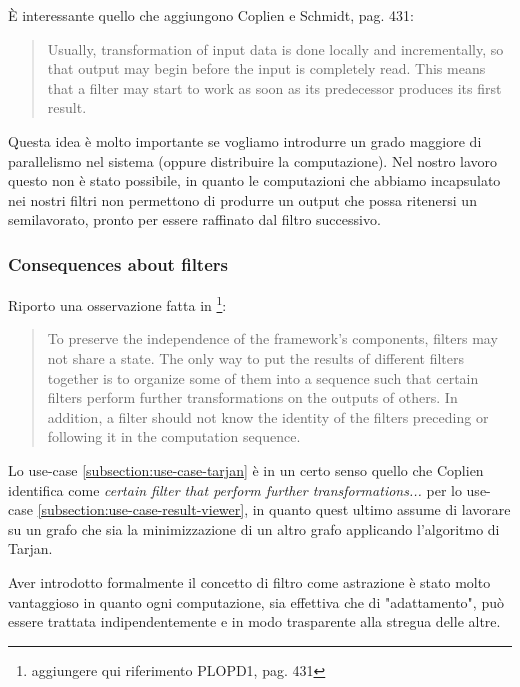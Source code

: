 \`E interessante quello che aggiungono Coplien e Schmidt, pag. 431:
\begin{quotation}
  Usually, transformation of input data is done locally and
  incrementally, so that output may begin before the input is
  completely read. This means that a filter may start to work as soon
  as its predecessor produces its first result.
\end{quotation}
Questa idea \`e molto importante se vogliamo introdurre un grado
maggiore di parallelismo nel sistema (oppure distribuire la
computazione). Nel nostro lavoro questo non \`e stato possibile, in
quanto le computazioni che abbiamo incapsulato nei nostri filtri non
permettono di produrre un output che possa ritenersi un semilavorato,
pronto per essere raffinato dal filtro successivo.

\subsubsection{Consequences about filters}
Riporto una osservazione fatta in \footnote{aggiungere qui riferimento
PLOPD1, pag. 431}:
\begin{quotation}
  To preserve the independence of the framework's components, filters
  may not share a state. The only way to put the results of different
  filters together is to organize some of them into a sequence such
  that certain filters perform further transformations on the outputs
  of others. In addition, a filter should not know the identity of the
  filters preceding or following it in the computation sequence.
\end{quotation}
Lo use-case \ref{subsection:use-case-tarjan} \`e in un certo senso
quello che Coplien identifica come \emph{certain filter that perform
  further transformations...} per lo use-case
\ref{subsection:use-case-result-viewer}, in quanto quest ultimo assume
di lavorare su un grafo che sia la minimizzazione di un altro grafo
applicando l'algoritmo di Tarjan.

Aver introdotto formalmente il concetto di filtro come astrazione \`e
stato molto vantaggioso in quanto ogni computazione, sia effettiva che
di "adattamento", pu\`o essere trattata indipendentemente e in modo
trasparente alla stregua delle altre.

